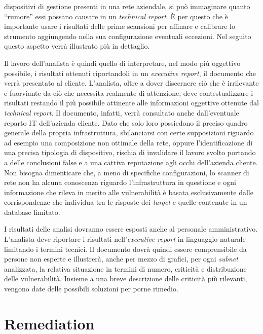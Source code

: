 \documentclass[target=bach,aauheader=]{thud}
\begin{document}
dispositivi di gestione presenti in una rete aziendale, si può immaginare quanto “rumore” essi possano causare in un \textit{technical report}. È per questo che è importante usare i risultati delle prime scansioni per affinare e calibrare lo strumento aggiungendo nella sua configurazione eventuali eccezioni. Nel seguito questo aspetto verrà illustrato più in dettaglio.

Il lavoro dell’analista è quindi quello di interpretare, nel modo più oggettivo possibile, i risultati ottenuti riportandoli in un \textit{executive report}, il documento che verrà presentato al cliente. L’analista, oltre a dover discernere ciò che è irrilevante e fuorviante da ciò che necessita realmente di attenzione, deve contestualizzare i risultati restando il più possibile attinente alle informazioni oggettive ottenute dal \textit{technical report}. Il documento, infatti, verrà consultato anche dall’eventuale reparto IT dell’azienda cliente. Dato che solo loro possiedono il preciso quadro generale della propria infrastruttura, sbilanciarsi con certe supposizioni riguardo ad esempio una composizione non ottimale della rete, oppure l’identificazione di una precisa tipologia di dispositivo, rischia di invalidare il lavoro svolto portando a delle conclusioni false e a una cattiva reputazione agli occhi dell’azienda cliente. Non bisogna dimenticare che, a meno di specifiche configurazioni, lo scanner di rete non ha alcuna conoscenza riguardo l’infrastruttura in questione e ogni informazione che rileva in merito alle vulnerabilità è basata esclusivamente dalle corrispondenze che individua tra le risposte dei \textit{target} e quelle contenute in un database limitato.

I risultati delle analisi dovranno essere esposti anche al personale amministrativo. L’analista deve riportare i risultati nell’\textit{executive report} in linguaggio naturale limitando i termini tecnici. Il documento dovrà quindi essere comprensibile da persone non esperte e illustrerà, anche per mezzo di grafici, per ogni \textit{subnet} analizzata, la relativa situazione in termini di numero, criticità e distribuzione delle vulnerabilità. Insieme a una breve descrizione delle criticità più rilevanti, vengono date delle possibili soluzioni per porne rimedio.

\section{Remediation}
\end{document}
